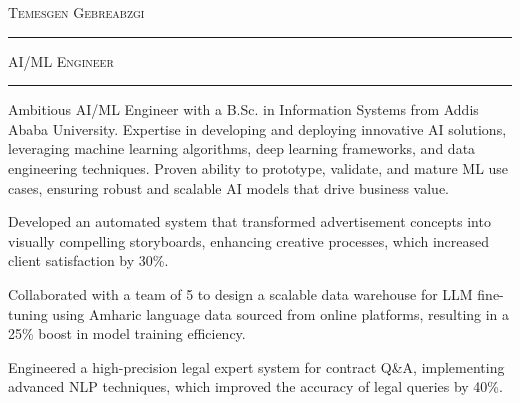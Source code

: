 \documentclass[10pt, A4]{classic}
\begin{document}
\begin{center}
    {\HUGE\textsc{Temesgen Gebreabzgi}} \textcolor{sectcol}{\rule[-1mm]{1mm}{0.9cm}} \textsc{AI/ML Engineer}\\[2pt]
\end{center}


        
        
        
    

\vspace{-2pt}
\textcolor{softcol}{\hrule}
\vspace{6pt}

\normalsize

\begin{highlights}
    \item {Ambitious AI/ML Engineer with a B.Sc. in Information Systems from Addis Ababa University. Expertise in developing and deploying innovative AI solutions, leveraging machine learning algorithms, deep learning frameworks, and data engineering techniques. Proven ability to prototype, validate, and mature ML use cases, ensuring robust and scalable AI models that drive business value.}
\end{highlights}

        
    \begin{highlights}
            \item {Developed an automated system that transformed advertisement concepts into visually compelling storyboards, enhancing creative processes, which increased client satisfaction by 30\%.}
            \item {Collaborated with a team of 5 to design a scalable data warehouse for LLM fine{-}tuning using Amharic language data sourced from online platforms, resulting in a 25\% boost in model training efficiency.}
            \item {Engineered a high{-}precision legal expert system for contract Q\&A, implementing advanced NLP techniques, which improved the accuracy of legal queries by 40\%.}
        \end{highlights}
        
\end{document}
